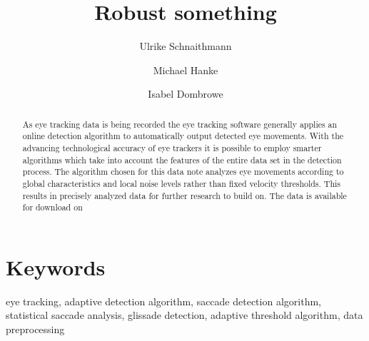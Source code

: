 \documentclass[10pt,a4paper,twocolumn]{article}
\begin{document}
\title{Robust something}
\author[1]{Ulrike Schnaithmann}
\author[2]{Michael Hanke}
\author[3]{Isabel Dombrowe}

\maketitle
\thispagestyle{fancy}


\begin{abstract}

As eye tracking data is being recorded the eye tracking software generally applies an online detection algorithm to automatically output detected eye movements. 
With the advancing technological accuracy of eye trackers it is possible to employ smarter algorithms which take into account the features of the entire data set in the detection process. The algorithm chosen for this data note analyzes eye movements according to global characteristics and local noise levels rather than fixed velocity thresholds. This results in precisely analyzed data for further research to build on. The data is available for download on 


\end{abstract}

\section*{Keywords}
eye tracking, adaptive detection algorithm, saccade detection algorithm, statistical saccade analysis, glissade detection, adaptive threshold algorithm, data preprocessing
\end{document}
